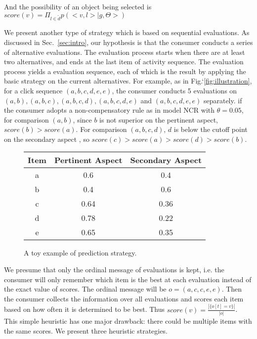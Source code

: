 \documentclass[sigconf]{acmart}
\begin{document}
And the possibility of an object being selected is $score(v)=\Pi_{l \in \tilde{d}} p(<v, l>|g,\Theta>)$ 


We present another type of strategy which is based on sequential evaluations. As discussed in Sec.~\ref{sec:intro}, our hypothesis is that the consumer conducts a series of alternative evaluations. The evaluation process starts when there are at least two alternatives, and ends at the last item of activity sequence. The evaluation process yields a evaluation sequence, each of which is the result by applying the basic strategy on the current alternatives. For example, as in Fig.`\ref{fig:illustration}, for a click sequence $(a,b,c,d,e,e)$, the consumer conducts 5 evaluations on $(a,b), (a,b,c), (a,b,c,d),(a,b,c,d,e)$ and $(a,b,c,d,e,e) $ separately. if the consumer adopts a non-compensatory rule as in model NCR with $\theta=0.05$, for comparison $(a,b)$, since $b$ is not superior on the pertinent aspect, $score(b)>score(a)$. For comparison $(a,b,c,d)$,  $d$ is below the cutoff point on the secondary aspect , so $score(c)>score(a)>score(d)>score(b)$. 

\begin{figure}[htbp]
\begin{center}
\begin{tabular}{|c|c|c|}
\hline
Item & Pertinent Aspect & Secondary Aspect \\\hline
a & 0.6 & 0.4 \\
b & 0.4 & 0.6  \\
c & 0.64 & 0.36 \\
d & 0.78 & 0.22 \\
e & 0.65 & 0.35 \\\hline
\end{tabular}
\caption{A toy example of prediction strategy. }
\label{default}
\end{center}
\end{figure}\label{fig:illustration}


We presume that only the ordinal message of evaluations is kept, i.e. the consumer will only remember which item is the best at each evaluation instead of the exact value of scores. The ordinal message will be $o=(a,c,c,e,e)$. Then the consumer collects the information over all evaluations and scores each item based on how often it is determined to be best. Thus $score(v)=\frac{|\{o[t] = v\}|}{|o|}$. This simple heuristic has one major drawback: there could be multiple items with the same scores. We present three heuristic strategies.
\end{document}
